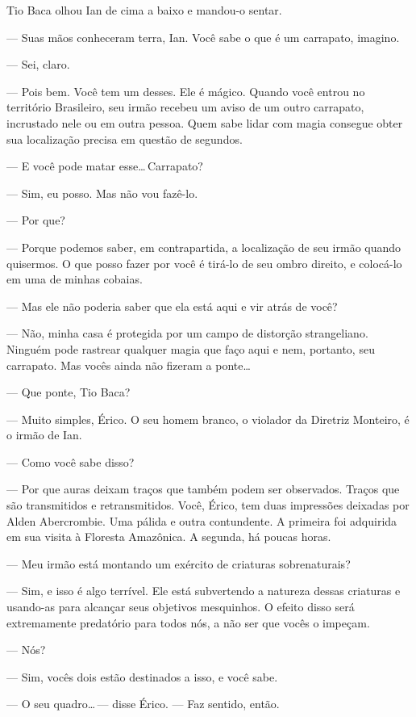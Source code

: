 Tio Baca olhou Ian de cima a baixo e mandou-o sentar.

--- Suas mãos conheceram terra, Ian. Você sabe o que é um carrapato, imagino.

--- Sei, claro.

--- Pois bem. Você tem um desses. Ele é mágico. Quando você entrou no
território Brasileiro, seu irmão recebeu um aviso de um outro carrapato,
incrustado nele ou em outra pessoa. Quem sabe lidar com magia consegue obter
sua localização precisa em questão de segundos.

--- E você pode matar esse\ldots\,Carrapato?

--- Sim, eu posso. Mas não vou fazê-lo.

--- Por que?

--- Porque podemos saber, em contrapartida, a localização de seu irmão quando
quisermos. O que posso fazer por você é tirá-lo de seu ombro direito, e
colocá-lo em uma de minhas cobaias.

--- Mas ele não poderia saber que ela está aqui e vir atrás de você?

--- Não, minha casa é protegida por um campo de distorção strangeliano. Ninguém
pode rastrear qualquer magia que faço aqui e nem, portanto, seu carrapato. Mas
vocês ainda não fizeram a ponte\ldots

--- Que ponte, Tio Baca?

--- Muito simples, Érico. O seu homem branco, o violador da Diretriz Monteiro,
é o irmão de Ian.

--- Como você sabe disso?

--- Por que auras deixam traços que também podem ser observados. Traços que são
transmitidos e retransmitidos. Você, Érico, tem duas impressões deixadas por
Alden Abercrombie. Uma pálida e outra contundente. A primeira foi adquirida em
sua visita à Floresta Amazônica. A segunda, há poucas horas.

--- Meu irmão está montando um exército de criaturas sobrenaturais?

--- Sim, e isso é algo terrível. Ele está subvertendo a natureza dessas
criaturas e usando-as para alcançar seus objetivos mesquinhos. O efeito disso
será extremamente predatório para todos nós, a não ser que vocês o impeçam.

--- Nós?

--- Sim, vocês dois estão destinados a isso, e você sabe.

--- O seu quadro\ldots\,--- disse Érico. --- Faz sentido, então.

